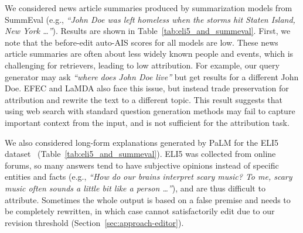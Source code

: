 \documentclass[11pt]{article}
\begin{document}
\begin{table}[!t]
\centering\small
{}
\caption{\textbf{Results on ELI5 and SummEval.}}
\label{tab:eli5_and_summeval}
\end{table}




We considered news article summaries produced by summarization models from SummEval \citep{fabbri21summeval} (e.g., \textit{``John Doe was left homeless when the storms hit Staten Island, New York \dots''}). Results are shown in Table~\ref{tab:eli5_and_summeval}. First, we note that the before-edit auto-AIS scores for all models are low. These news article summaries are often about less widely known people and events, which is challenging for retrievers, leading to low attribution. For example, our query generator may ask \emph{``where does John Doe live''} but get results for a different John Doe. EFEC and LaMDA also face this issue, but instead trade preservation for attribution and rewrite the text to a different topic. 
This result suggests that using web search with standard question generation methods may fail to capture important context from the input, and is not sufficient for the attribution task.

We also considered long-form explanations generated by PaLM for the ELI5 dataset~\citep{fan19eli5} (Table~\ref{tab:eli5_and_summeval}). ELI5 was collected from online forums, so many answers tend to have subjective opinions instead of specific entities and facts (e.g., \textit{``How do our brains interpret scary music? To me, scary music often sounds a little bit like a person \dots''}), and are thus difficult to attribute. Sometimes the whole output is based on a false premise and needs to be completely rewritten, in which case \approach{} cannot satisfactorily edit due to our revision threshold (Section~\ref{sec:approach-editor}). %
\end{document}
